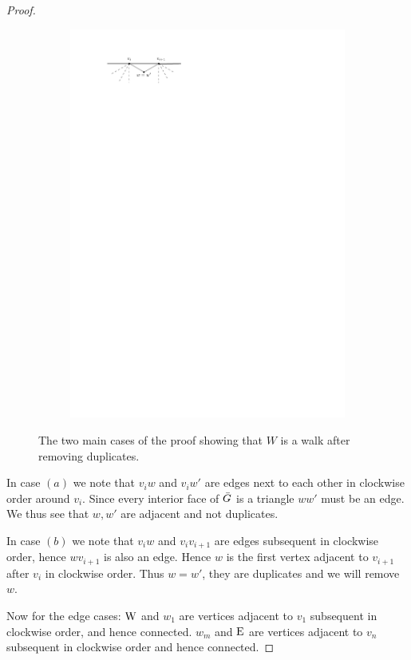 \begin{proof}
\begin{figure}
\begin{subfigure}[b]{0.5\linewidth}
        \caption{}
    \end{subfigure}%
    \begin{subfigure}[b]{0.5\linewidth}
        \includegraphics[width=\linewidth]{img/walkProofB}
        \vspace{1cm}   
                
        \caption{}
    \end{subfigure}

    	\caption{The two main cases of the proof showing that $W$ is a walk after removing duplicates.}
	\label{fig:walkproof}
\end{figure}


In case $(a)$ we note that $v_i w$ and $v_i w'$ are edges next to each other in clockwise order around $v_i$. Since every interior face of $\bar{G}$ is a triangle $ww'$ must be an edge. We thus see that $w, w'$ are adjacent and not duplicates.

In case $(b)$ we note that $v_i w$ and $v_i v_{i+1}$ are edges subsequent in clockwise order, hence $wv_{i+1}$ is also an edge. Hence $w$ is the first vertex adjacent to $v_{i+1}$ after $v_i$ in clockwise order. Thus $w= w'$, they are duplicates and we will remove $w$.

Now for the edge cases: $\mathrm{W}$ and $w_1$ are vertices adjacent to $v_1$ subsequent in clockwise order, and hence connected. $w_m$ and $\mathrm{E}$ are vertices adjacent to $v_n$ subsequent in clockwise order and hence connected. 
\end{proof}


